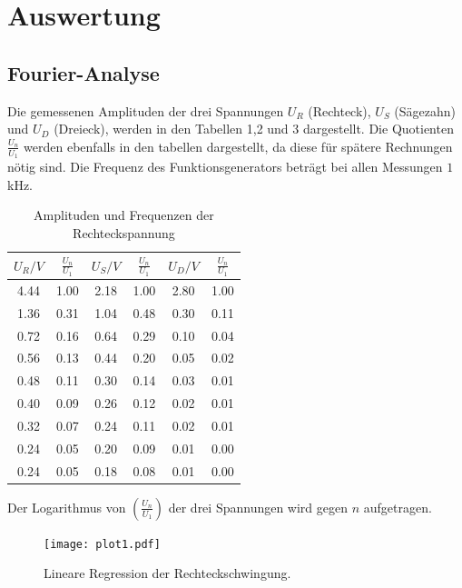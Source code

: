 \section{Auswertung}
\label{sec:Auswertung}

\subsection{Fourier-Analyse}

Die gemessenen Amplituden der drei Spannungen $U_R$ (Rechteck), $U_S$ (Sägezahn) und $U_D$ (Dreieck), werden in den Tabellen 1,2 und 3 dargestellt.
Die Quotienten $\frac{U_n}{U_1}$ werden ebenfalls in den tabellen dargestellt, da diese für
spätere Rechnungen nötig sind.
 Die Frequenz des Funktionsgenerators beträgt bei allen Messungen $1$kHz.

\begin{table}[H]
  \centering
  \caption{Amplituden und Frequenzen der Rechteckspannung}
  \label{tab:Rechteckspannung}
  \begin{tabular}{c c | c c | c c}
    \toprule
    $U_R/V$ & $\frac{U_n}{U_1}$ & $U_S/V$ & $\frac{U_n}{U_1}$ & $U_D/V$ & $\frac{U_n}{U_1}$ \\
    \midrule
    4.44 & 1.00 & 2.18 & 1.00 & 2.80 &  1.00 \\
    1.36 & 0.31 & 1.04 & 0.48 & 0.30 &  0.11\\
    0.72 & 0.16 & 0.64 & 0.29 & 0.10 &  0.04\\
    0.56 & 0.13 & 0.44 & 0.20 & 0.05 &  0.02\\
    0.48 & 0.11 & 0.30 & 0.14 & 0.03 &  0.01\\
    0.40 & 0.09 & 0.26 & 0.12 & 0.02 &  0.01\\
    0.32 & 0.07 & 0.24 & 0.11 & 0.02 &  0.01\\
    0.24 & 0.05 & 0.20 & 0.09 & 0.01 &  0.00\\
    0.24 & 0.05 & 0.18 & 0.08 & 0.01 &  0.00\\
    \bottomrule
  \end{tabular}
\end{table}

Der Logarithmus von $\left( \frac{U_n}{U_1}\right)$ der drei Spannungen wird gegen $n$ aufgetragen.

\begin{figure}
  \centering
  \texttt{[image: plot1.pdf]}
  \caption{Lineare Regression der Rechteckschwingung.}
  \label{fig:rechteck}
\end{figure}

